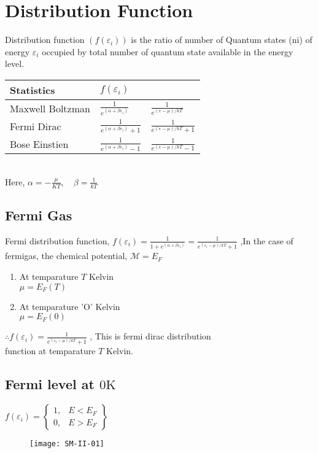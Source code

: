 \section{Distribution Function}
Distribution function $\left(f\left(\varepsilon_{i}\right)\right)$ is the ratio of number of Quantum states (ni) of energy $\varepsilon_{i}$ occupied by total number of quantum state available in the energy level.\\
\renewcommand*{\arraystretch}{2}
\begin{tabular}{|p{3cm}|p{3cm}|p{3cm}|}
	\hline
	Statistics&$f\left(\varepsilon_{i}\right)$& \\\hline
	Maxwell Boltzman&$\frac{1}{e^{\left(\alpha+\beta \varepsilon_{i}\right)}}$& $\frac{1}{e^{(\varepsilon-\mu) / k T}}$\\\hline
	Fermi Dirac&$\frac{1}{e^{\left(\alpha+\beta \varepsilon_{i}\right)}+1}$&$\frac{1}{e^{(\varepsilon-\mu) / k T}+1}$\\\hline
	Bose Einstien &$\frac{1}{e^{\left(\alpha+\beta \varepsilon_{i}\right)}-1}$&$\frac{1}{e^{(\varepsilon-\mu) / k T}-1}$\\\hline
\end{tabular}\\
Here, $\alpha=-\frac{\mu}{K T}, \quad \beta=\frac{1}{k T}$
\subsection{Fermi Gas}
Fermi distribution function, $f\left(\varepsilon_{i}\right)=\frac{1}{1+e^{(\alpha+\beta \varepsilon_i)}}=\frac{1}{e^{(\varepsilon_i-\mu) / k T}+1}$ ,In the case of fermigas, the chemical potential, $\mathcal{M}=E_F$
\begin{enumerate}[label=\roman*)]
	\item At temparature $T$ Kelvin\\
	$\mu=E_{F}(T)$
	\item At temparature 'O' Kelvin\\
	$
	\mu=E_{F}(0)
	$
\end{enumerate}
$\therefore f\left(\varepsilon_{i}\right)=\frac{1}{e^{(\varepsilon_i-\mu) / k T}+1}$ , This is fermi dirac distribution\\
function at temparature $T$ Kelvin.
\subsection{Fermi level at $\mathrm{0K}$}
$f\left(\varepsilon_{i}\right)=\left\{\begin{array}{ll}1, & E<E_{F} \\ 0, & E>E_{F}\end{array}\right\}$
\begin{figure}[H]
	\centering
	\texttt{[image: SM-II-01]}
\end{figure}
